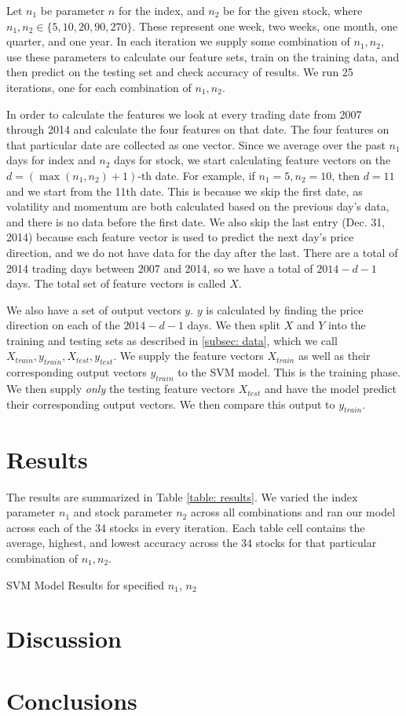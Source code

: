 \documentclass[pageno]{jpaper}
\begin{document}
Let $n_1$ be parameter $n$ for the index, and $n_2$ be for the given stock, where $n_1, n_2 \in \{5, 10, 20, 90, 270\}$. These represent one week, two weeks, one month, one quarter, and one year. In each iteration we supply some combination of $n_1, n_2$, use these parameters to calculate our feature sets, train on the training data, and then predict on the testing set and check accuracy of results. We run 25 iterations, one for each combination of $n_1, n_2$.

In order to calculate the features we look at every trading date from 2007 through 2014 and calculate the four features on that date. The four features on that particular date are collected as one vector. Since we average over the past $n_1$ days for index and $n_2$ days for stock, we start calculating feature vectors on the $d = (\max(n_1, n_2) + 1)$-th date. For example, if $n_1 = 5, n_2 = 10$, then $d=11$ and we start from the 11th date. This is because we skip the first date, as volatility and momentum are both calculated based on the previous day's data, and there is no data before the first date. We also skip the last entry (Dec. 31, 2014) because each feature vector is used to predict the next day's price direction, and we do not have data for the day after the last. There are a total of 2014 trading days between 2007 and 2014, so we have a total of $2014 - d - 1$ days. The total set of feature vectors is called $X$.

We also have a set of output vectors $y$. $y$ is calculated by finding the price direction on each of the $2014-d-1$ days. We then split $X$ and $Y$ into the training and testing sets as described in \ref{subsec: data}, which we call $X_{train}, y_{train}, X_{test}, y_{test}$. We supply the feature vectors $X_{train}$ as well as their corresponding output vectors $y_{train}$ to the SVM model. This is the training phase. We then supply {\em only} the testing feature vectors $X_{test}$ and have the model predict their corresponding output vectors. We then compare this output to $y_{train}$.

\section{Results}
\label{sec: results}
The results are summarized in Table \ref{table: results}. We varied the index parameter $n_1$ and stock parameter $n_2$ across all combinations and ran our model across each of the 34 stocks in every iteration. Each table cell contains the average, highest, and lowest accuracy across the 34 stocks for that particular combination of $n_1, n_2$. 

\begin{table}
\caption{SVM Model Results for specified $n_1$, $n_2$}
\label{table: results}
\end{table}

\section{Discussion}

\section{Conclusions}



\end{document}

